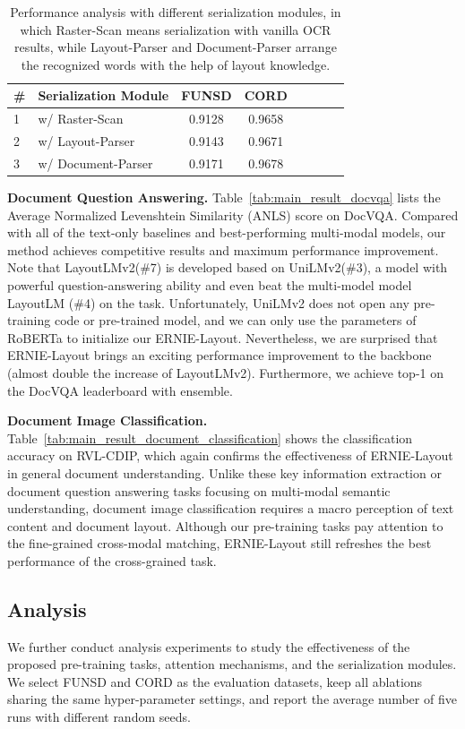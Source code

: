 \documentclass[11pt]{article}
\begin{document}
\begin{table}[ht]
\centering
\small
\begin{tabular}{llcccccc}
\toprule
\# & \textbf{Serialization Module} & \textbf{FUNSD} & \textbf{CORD} \\
\midrule
1 &\quad w/ Raster-Scan  & 0.9128  & 0.9658\\
2 &\quad w/ Layout-Parser    & 0.9143  & 0.9671 \\
3 &\quad w/ Document-Parser  & 0.9171  & 0.9678\\
\bottomrule
\end{tabular}
\caption{Performance analysis with different serialization modules, in which Raster-Scan means serialization with vanilla OCR results, while Layout-Parser and Document-Parser arrange the recognized words with the help of layout knowledge.}
\label{tab:layout_compare}
\end{table}




\noindent\textbf{Document Question Answering.}
Table~\ref{tab:main_result_docvqa} lists the Average Normalized Levenshtein Similarity (ANLS) score on DocVQA. 
Compared with all of the text-only baselines and best-performing multi-modal models, our method achieves competitive results and maximum performance improvement.
Note that LayoutLMv2(\#7) is developed based on UniLMv2(\#3), a model with powerful question-answering ability and even beat the multi-model model LayoutLM (\#4) on the task.
Unfortunately, UniLMv2 does not open any pre-training code or pre-trained model, and we can only use the parameters of RoBERTa to initialize our ERNIE-Layout. 
Nevertheless, we are surprised that ERNIE-Layout brings an exciting performance improvement to the backbone (almost double the increase of LayoutLMv2).
Furthermore, we achieve top-1 on the DocVQA leaderboard with ensemble.

\noindent\textbf{Document Image Classification.}
Table~\ref{tab:main_result_document_classification} shows the classification accuracy on RVL-CDIP, which again confirms the effectiveness of ERNIE-Layout in general document understanding.
Unlike these key information extraction or document question answering tasks focusing on multi-modal semantic understanding, document image classification requires a macro perception of text content and document layout.
Although our pre-training tasks pay attention to the fine-grained cross-modal matching, ERNIE-Layout still refreshes the best performance of the cross-grained task.


\subsection{Analysis}
We further conduct analysis experiments to study the effectiveness of the proposed pre-training tasks, attention mechanisms, and the serialization modules.
We select FUNSD and CORD as the evaluation datasets, keep all ablations sharing the same hyper-parameter settings, and report the average number of five runs with different random seeds.
\end{document}
